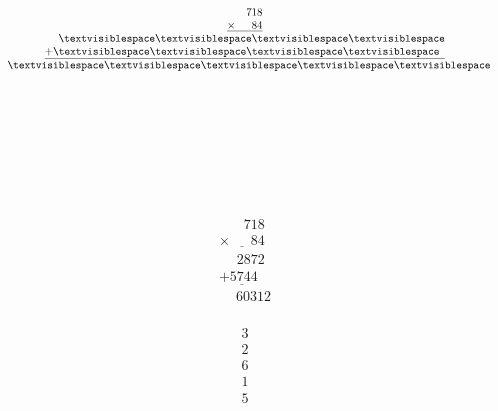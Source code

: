\begin{minipage}[t]{0.3\linewidth}
\begin{align*}\begin{array}{c}
\phantom{
\times00
}
718\\
\underline{
\times
\phantom{
000
}
84
}\\
\phantom{
+0
}
\textvisiblespace
\textvisiblespace
\textvisiblespace
\textvisiblespace
\\
\underline{
+
\textvisiblespace
\textvisiblespace
\textvisiblespace
\textvisiblespace
\phantom0
}
\\
\phantom{+}
\textvisiblespace
\textvisiblespace
\textvisiblespace
\textvisiblespace
\textvisiblespace
\end{array}\end{align*}
\end{minipage}
\begin{minipage}[t]{0.05\linewidth}
\begin{align*}\begin{array}{c}
\textvisiblespace
\\
\textvisiblespace
\\
\textvisiblespace
\\
\textvisiblespace
\\
\textvisiblespace
\end{array}\end{align*}
\end{minipage}
\begin{minipage}[t]{0.05\linewidth}
\begin{align*}\begin{array}{c}
\end{array}\end{align*}
\end{minipage}
\begin{minipage}[t]{0.3\linewidth}
\begin{align*}\begin{array}{c}
\phantom{
\times00
}
718\\
\underline{
\times
\phantom{
000
}
84
}\\
\phantom{
+0
}
2872
\\
\underline{
+
5744
\phantom0
}
\\
\phantom{+}
60312
\end{array}\end{align*}
\end{minipage}
\begin{minipage}[t]{0.05\linewidth}
\begin{align*}\begin{array}{c}
3
\\
2
\\
6
\\
1
\\
5
\end{array}\end{align*}
\end{minipage}
\begin{minipage}[t]{0.05\linewidth}
\begin{align*}\begin{array}{c}
\end{array}\end{align*}
\end{minipage}

